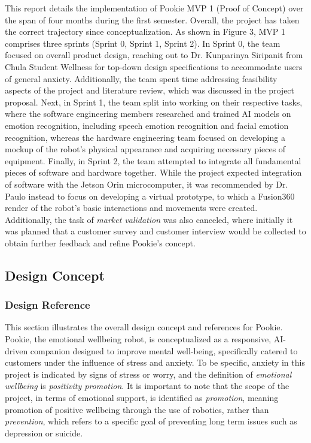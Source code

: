 This report details the implementation of Pookie MVP 1 (Proof of Concept) over the span of four months during the first semester. Overall, the project has taken the correct trajectory since conceptualization. As shown in Figure 3, MVP 1 comprises three sprints (Sprint 0, Sprint 1, Sprint 2). In Sprint 0, the team focused on overall product design, reaching out to Dr. Kunparinya Siripanit from Chula Student Wellness for top-down design specifications to accommodate users of general anxiety. Additionally, the team spent time addressing feasibility aspects of the project and literature review, which was discussed in the project proposal. Next, in Sprint 1, the team split into working on their respective tasks, where the software engineering members researched and trained AI models on emotion recognition, including speech emotion recognition and facial emotion recognition, whereas the hardware engineering team focused on developing a mockup of the robot’s physical appearance and acquiring necessary pieces of equipment. Finally, in Sprint 2, the team attempted to integrate all fundamental pieces of software and hardware together. While the project expected integration of software with the Jetson Orin microcomputer, it was recommended by Dr. Paulo instead to focus on developing a virtual prototype, to which a Fusion360 render of the robot’s basic interactions and movements were created. Additionally, the task of \textit{market validation} was also canceled, where initially it was planned that a customer survey and customer interview would be collected to obtain further feedback and refine Pookie’s concept.

\newpage
\subsection{Design Concept}

\subsubsection{Design Reference}

This section illustrates the overall design concept and references for Pookie. Pookie, the emotional wellbeing robot, is conceptualized as a responsive, AI-driven companion designed
to improve mental well-being, specifically catered to customers under the influence of stress and anxiety. To be specific, anxiety in this project is indicated by signs of stress or worry, and the definition of \textit{emotional wellbeing} is \textit{positivity promotion}. It is important to note that the scope of the project, in terms of emotional support, is identified as \textit{promotion}, meaning promotion of positive wellbeing through the use of robotics, rather than \textit{prevention}, which refers to a specific goal of preventing long term issues such as depression or suicide.

